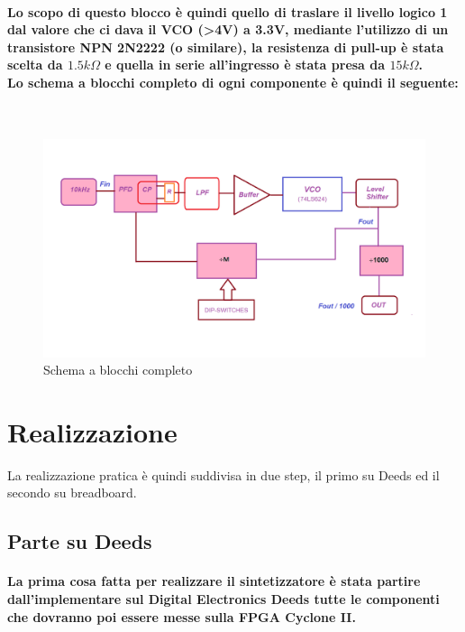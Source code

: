 \documentclass[a4paper]{article}
\begin{document}
\paragraph{Lo scopo di questo blocco è quindi quello di traslare il livello logico 1 dal valore che ci dava il VCO (\textgreater 4V) a 3.3V, mediante l'utilizzo di un transistore NPN 2N2222 (o similare), la resistenza di pull-up è stata scelta da $1.5k\Omega$ e quella in serie all'ingresso è stata presa da $15k\Omega$.\\
Lo schema a blocchi completo di ogni componente è quindi il seguente:}
~\begin{figure}[H]%
\includegraphics[scale=0.4]{PLL_1.png} 
\centering
\caption{Schema a blocchi completo}
\label{fig:foo}
\end{figure}


\newpage
\section{Realizzazione}
La realizzazione pratica è quindi suddivisa in due step, il primo su Deeds ed il secondo su breadboard.
\subsection{Parte su Deeds}
\paragraph{La prima cosa fatta per realizzare il sintetizzatore è stata partire dall'implementare sul Digital Electronics Deeds tutte le componenti che dovranno poi essere messe sulla FPGA Cyclone II.}
\end{document}
